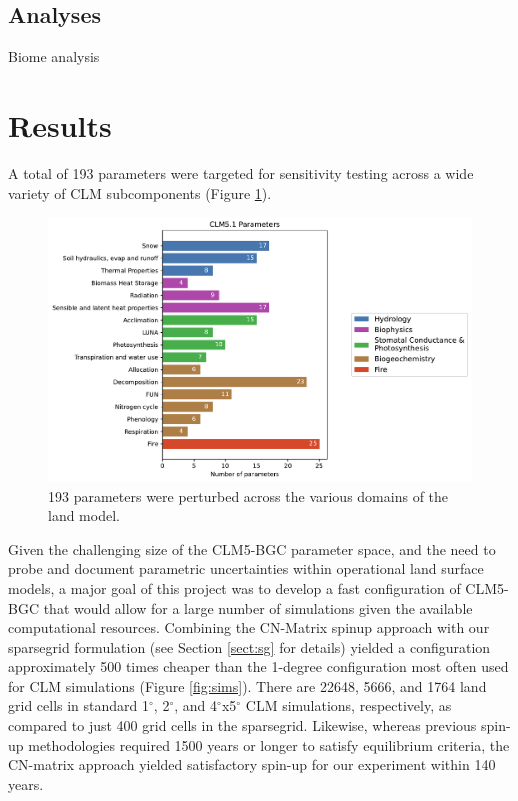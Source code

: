 \documentclass[draft]{agujournal2019}
\begin{document}
\subsection{Analyses}

Biome analysis

\section{Results}

A total of 193 parameters were targeted for sensitivity testing across a wide variety of CLM subcomponents (Figure \ref{fig:params}).

\begin{figure}[h]
\centering
\includegraphics[width=\textwidth]{../figs/bar.pdf}
\caption{193 parameters were perturbed across the various domains of the land model.}
\label{fig:params}
\end{figure}

Given the challenging size of the CLM5-BGC parameter space, and the need to probe and document parametric uncertainties within operational land surface models, a major goal of this project was to develop a fast configuration of CLM5-BGC that would allow for a large number of simulations given the available computational resources.
Combining the CN-Matrix spinup approach with our sparsegrid formulation (see Section \ref{sect:sg} for details) yielded a configuration approximately 500 times cheaper than the 1-degree configuration most often used for CLM simulations (Figure \ref{fig:sims}).
There are 22648, 5666, and 1764 land grid cells in standard 1$^{\circ}$, 2$^{\circ}$, and 4$^{\circ}$x5$^{\circ}$ CLM simulations, respectively, as compared to just 400 grid cells in the sparsegrid.
Likewise, whereas previous spin-up methodologies required 1500 years or longer to satisfy equilibrium criteria, the CN-matrix approach yielded satisfactory spin-up for our experiment within 140 years.
\end{document}
